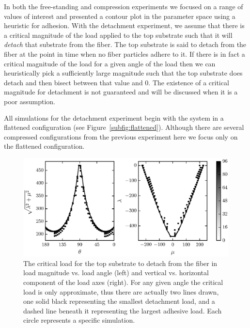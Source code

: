 In both the free-standing and compression experiments we focused on a range of values of interest and presented a contour plot in the parameter space using a heuristic for adhesion. With the detachment experiment,  we assume that there is a critical magnitude of the load applied to the top substrate such that it will \textit{detach} that substrate from the fiber. The top substrate is said to detach from the fiber at the point in time when no fiber particles adhere to it. If there is in fact a critical magnitude of the load for a given angle of the load then we can heuristically pick a sufficiently large magnitude such that the top substrate does detach and then bisect between that value and $0$. The existence of a critical magnitude for detachment is not guaranteed and will be discussed when it is a poor assumption.

All simulations for the detachment experiment begin with the system in a flattened configuration (see Figure~\ref{subfig:flattened}). Although there are several compressed configurations from the previous experiment here we focus only on the flattened configuration.
   
   \begin{figure}[t]
      \begin{center}
         \includegraphics{./fig/ch3/pull/ref/grid.eps}
      \end{center}      
      \caption{The critical load for the top substrate to detach from the fiber in load magnitude vs. load angle (left) and vertical vs. horizontal component of the load axes (right). For any given angle the critical load is only approximate, thus there are actually two lines drawn, one solid black representing the smallest detachment load, and a dashed line beneath it representing the largest adhesive load. Each circle represents a specific simulation.
      \label{fig:pull:ref}}
   \end{figure}

